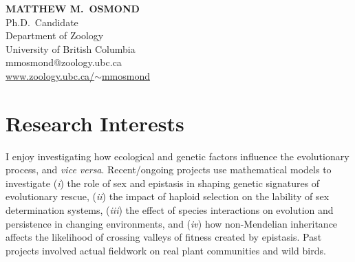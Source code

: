\documentclass[12pt]{article}
\begin{document}
\thispagestyle{empty} 
\pagestyle{fancy}

{\raggedleft
\noindent\Large{\textbf{MATTHEW M.\ OSMOND}}\\
\large Ph.D.\ Candidate\\
\large Department of Zoology\\
\large University of British Columbia \\
\large mmosmond@zoology.ubc.ca\\
\href{https://www.zoology.ubc.ca/~mmosmond/}{www.zoology.ubc.ca/$\sim$mmosmond}\\
}



\section*{Research Interests}

I enjoy investigating how ecological and genetic factors influence the evolutionary process, and \textit{vice versa}.
Recent/ongoing projects use mathematical models to investigate (\textit{i}) the role of sex and epistasis in shaping genetic signatures of evolutionary rescue, (\textit{ii}) the impact of haploid selection on the lability of sex determination systems, (\textit{iii}) the effect of species interactions on evolution and persistence in changing environments, and (\textit{iv}) how non-Mendelian inheritance affects the likelihood of crossing valleys of fitness created by epistasis.
Past projects involved actual fieldwork on real plant communities and wild birds.
\end{document}
